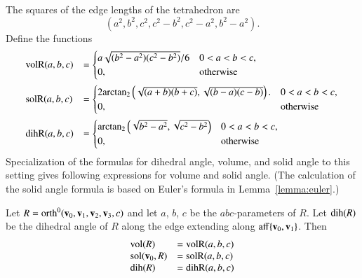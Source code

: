 The squares of the edge lengths of the tetrahedron are
   \begin{displaymath}
   (a^2,b^2,c^2,c^2-b^2,c^2-a^2,b^2-a^2).
   \end{displaymath}
Define the functions
   \begin{displaymath}
   \begin{array}{lll}
     \op{volR}(a,b,c) &= \begin{cases}
       a\sqrt{(b^2-a^2)(c^2-b^2)}/6& 0 < a < b < c,\\
       0,&\text{otherwise}
       \end{cases}\vspace{6pt}\\
     \op{solR}(a,b,c) &= \begin{cases}
      2 \atn\left(\sqrt{{(a+b)(b+c)}},
         \sqrt{{(b-a) (c-b)}}\right).& 0 < a < b < c,\\
      0,&\text{otherwise}
     \end{cases} \vspace{6pt}\\
     \op{dihR}(a,b,c) &= \begin{cases}
      \atn\left(\sqrt{b^2 - a^2},\sqrt{c^2 - b^2}\right)
      & 0 < a < b < c,\\
      0,&\text{otherwise}
     \end{cases}
     \end{array}
   \end{displaymath}
%
%
%
Specialization of the formulas for dihedral angle, volume, and solid angle to this
setting gives following expressions for volume and solid angle.
(The calculation of the
 solid angle formula is based on Euler's formula in 
Lemma~\ref{lemma:euler}.)

\begin{lemma}\label{lemma:orth:abc} 
Let $R={\operatorname{orth}}^0({\mathbf v}_0,{\mathbf v}_1,{\mathbf v}_2,{\mathbf v}_3,c)$ and let $a$, $b$,
$c$ be the $abc$-parameters of $R$.  Let ${\operatorname{dih}}(R)$ be the dihedral
angle of $R$ along the edge extending along ${\operatorname{aff}}\{{\mathbf v}_0,{\mathbf v}_1\}$.  Then
\begin{displaymath}
\begin{array}{lll}
{\operatorname{vol}}(R) &= {\operatorname{volR}}(a,b,c)\\
{\operatorname{sol}}({\mathbf v}_0,R) &= {\operatorname{solR}}(a,b,c)\\
{\operatorname{dih}}(R) &= {\operatorname{dihR}}(a,b,c)\\
\end{array}
\end{displaymath}
\end{lemma}
%
%
%
%

